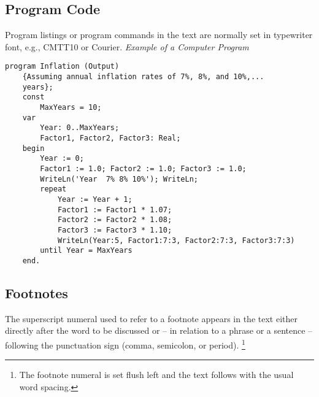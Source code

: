 \documentclass[runningheads]{llncs}
\begin{document}
	\subsection{Program Code}
	Program listings or program commands in the text are normally set in typewriter font, e.g., CMTT10 or Courier.
	\medskip
	\noindent
	{\it Example of a Computer Program}
	\begin{lstlisting}[caption={Example from Jensen K., Wirth N. (1991) Pascal user manual and report. Springer, New York}]
program Inflation (Output)
	{Assuming annual inflation rates of 7%, 8%, and 10%,...
	years};
	const
		MaxYears = 10;
	var
		Year: 0..MaxYears;
		Factor1, Factor2, Factor3: Real;
	begin
		Year := 0;
		Factor1 := 1.0; Factor2 := 1.0; Factor3 := 1.0;
		WriteLn('Year  7% 8% 10%'); WriteLn;
		repeat
			Year := Year + 1;
			Factor1 := Factor1 * 1.07;
			Factor2 := Factor2 * 1.08;
			Factor3 := Factor3 * 1.10;
			WriteLn(Year:5, Factor1:7:3, Factor2:7:3, Factor3:7:3)
		until Year = MaxYears
	end.
	\end{lstlisting}
	\noindent

	\subsection{Footnotes}
	The superscript numeral used to refer to a footnote appears in the text either directly after the word to be discussed or -- in relation to a phrase or a sentence -- following the punctuation sign (comma, semicolon, or period).
	\footnote{The footnote numeral is set flush left and the text follows with the usual word spacing.}
\end{document}
